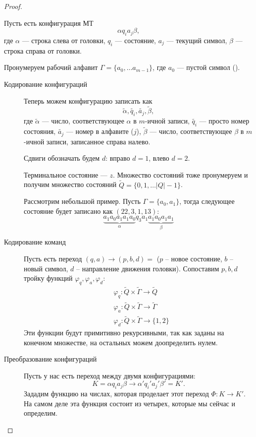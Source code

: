 \begin{proof}
\begin{description}
			Пусть есть конфигурация МТ 
			$$ \alpha q_i a_j \beta ,$$ где $ \alpha $ --- строка слева от головки, $ q_i$ --- состояние, $ a_j$ --- текущий символ, $ \beta $ --- строка справа от головки.

			Пронумеруем рабочий алфавит $ \Gamma = \{a_0, \ldots a_{m-1}\}$, где $ a_0$ --- пустой символ (\textvisiblespace).

			\begin{description}
				\item[Кодирование конфигураций]
			Теперь можем конфигурацию записать как 
			 \[
				 \widetilde{ \alpha } , \widetilde{ q_i} , \widetilde{ a_j} , \widetilde{ \beta } 
			,\] 
			где $ \widetilde{ \alpha } $ --- число, соответствующее $ \alpha $  в $  m$-ичной записи, $ \widetilde{ q_i} $ --- просто номер состояния, $ \widetilde{ a_j} $ --- номер  в алфавите ($ j$), $ \widetilde{ \beta } $ --- число, соответствующее $ \beta $ в $ m$-ичной записи, записанное справа налево. 

			Сдвиги обозначать будем $ d$: вправо  $d= 1$, влево $ d= 2$.

			Терминальное состояние --- $ z$. 
			Множество состояний тоже пронумеруем и получим множество состояний $ \widetilde{ Q}  = \{0, 1, \ldots \lvert Q \rvert - 1\}$.

			\begin{ex}
			    Рассмотрим небольшой пример. Пусть 
				$ \Gamma = \{a_0, a_1\}$, тогда следующее состояние 
				будет записано как $ (22, 3, 1, 13) $:
				\[
					\underbrace{a_1a_0a_1a_1a_0}_{ \alpha } q_3 a_1 \underbrace{a_1 a_0 a_1a_1}_{ \beta }
				\]
			\end{ex}

		\item [Кодирование команд]
			Пусть есть переход $ (q, a) \to (p, b, d) = $ ($ p$ -- новое состояние, $ b$ -- новый символ, $ d$ -- направление движения головки).
			Сопоставим $ p, b, d$ тройку функций $ \varphi _{q}, \varphi _{a}, \varphi _{d}$:
			\[
			\begin{aligned}
				& \varphi _{q} \colon \widetilde{ Q} \times \widetilde{ \Gamma }  \to  \widetilde{ Q} \\
				&\varphi _a \colon \widetilde{ Q} \times \widetilde{ \Gamma  }  \to \widetilde{ \Gamma } \\
				& \varphi _{d} \colon \widetilde{ Q} \times \widetilde{ \Gamma } \to \{1, 2\}
			\end{aligned}
			\]
			Эти функции будут примитивно рекурсивными, так как заданы на конечном множестве, на остальных можем доопределить нулем.
		\item[Преобразование конфигураций]
			Пусть у нас есть переход между двумя конфигурациями: 
			$$ K = \alpha q_i a_j \beta  \to \alpha ' q_i' a_j' \beta' = K'.$$
			Зададим функцию на числах, которая проделает этот переход $ \Phi \colon K \to  K'$. На самом деле эта функция состоит из четырех, которые мы сейчас и определим.


\end{description}
\end{description}
\end{proof}
